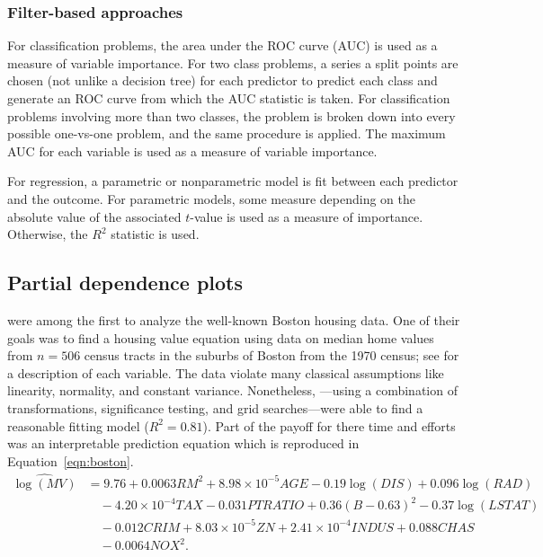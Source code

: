 \documentclass{article}
\begin{document}
\subsubsection{Filter-based approaches}


For classification problems, the area under the ROC curve (AUC) is used as a measure of variable importance. For two class problems, a series a split points are chosen (not unlike a decision tree) for each predictor to predict each class and generate an ROC curve from which the AUC statistic is taken. For classification problems involving more than two classes, the problem is broken down into every possible one-vs-one problem, and the same procedure is applied. The maximum AUC for each variable is used as a measure of variable importance.

For regression, a parametric or nonparametric model is fit between each predictor and the outcome. For parametric models, some measure depending on the absolute value of the associated $t$-value is used as a measure of importance. Otherwise, the $R^2$ statistic is used.


\subsection{Partial dependence plots}

\citet{harrison-1978-hedonic} were among the first to analyze the well-known Boston housing data. One of their goals was to find a housing value equation using data on median home values from $n = 506$ census tracts in the suburbs of Boston from the 1970 census; see \citet[Table IV]{harrison-1978-hedonic} for a description of each variable. The data violate many classical assumptions like linearity, normality, and constant variance. Nonetheless, \citeauthor{harrison-1978-hedonic}---using a combination of transformations, significance testing, and grid searches---were able to find a reasonable fitting model ($R^2 = 0.81$). Part of the payoff for there time and efforts was an interpretable prediction equation which is reproduced in Equation~\eqref{eqn:boston}.
\begin{equation}
\label{eqn:boston}
\begin{aligned}
\widehat{\log\left(MV\right)} &= 9.76 + 0.0063 RM^2 + 8.98\times10^{-5} AGE - 0.19\log\left(DIS\right) + 0.096\log\left(RAD\right) \\
  & \quad - 4.20\times10^{-4} TAX - 0.031 PTRATIO + 0.36\left(B - 0.63\right)^2 - 0.37\log\left(LSTAT\right) \\
  & \quad - 0.012 CRIM + 8.03\times10^{-5} ZN + 2.41\times10^{-4} INDUS + 0.088 CHAS \\
  & \quad - 0.0064 NOX^2.
\end{aligned}
\end{equation}
\end{document}
